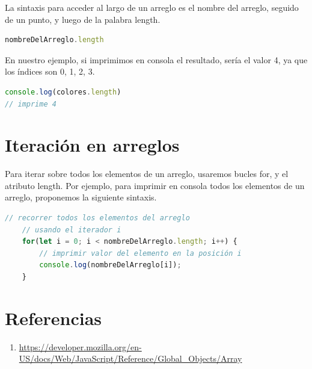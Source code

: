 \documentclass[../principal.tex]{subfiles}
\begin{document}
La sintaxis para acceder al largo de un arreglo es el nombre del arreglo, seguido de un punto, y luego de la palabra length.

\begin{lstlisting}[language=JavaScript]
nombreDelArreglo.length
\end{lstlisting}

En nuestro ejemplo, si imprimimos en consola el resultado, sería el valor 4, ya que los índices son 0, 1, 2, 3.

\begin{lstlisting}[language=JavaScript]
console.log(colores.length)
// imprime 4
\end{lstlisting}

\section{Iteración en arreglos}

Para iterar sobre todos los elementos de un arreglo, usaremos bucles for, y el atributo length. Por ejemplo, para imprimir en consola todos los elementos de un arreglo, proponemos la siguiente sintaxis.

\begin{lstlisting}[language=JavaScript]
    // recorrer todos los elementos del arreglo
    // usando el iterador i
    for(let i = 0; i < nombreDelArreglo.length; i++) {
        // imprimir valor del elemento en la posición i
        console.log(nombreDelArreglo[i]);
    }
\end{lstlisting}


\section{Referencias}

\begin{enumerate}
    \item \url{https://developer.mozilla.org/en-US/docs/Web/JavaScript/Reference/Global_Objects/Array}
\end{enumerate}
\end{document}
